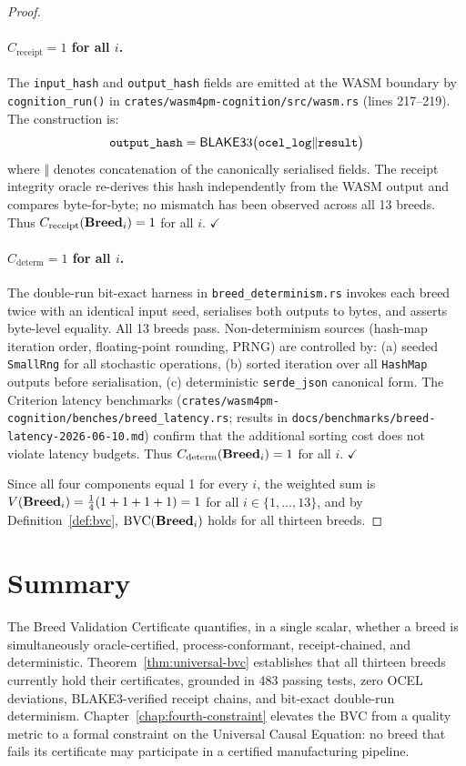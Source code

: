 \begin{proof}
\paragraph{$C_{\mathrm{receipt}} = 1$ for all $i$.}
The \texttt{input\_hash} and \texttt{output\_hash} fields are emitted at the WASM
boundary by \texttt{cognition\_run()} in
\texttt{crates/wasm4pm-cognition/src/wasm.rs} (lines 217--219). The construction is:
\[
  \texttt{output\_hash} = \mathsf{BLAKE3}3\bigl(\texttt{ocel\_log} \Vert \texttt{result}\bigr)
\]
where $\Vert$ denotes concatenation of the canonically serialised fields. The receipt
integrity oracle re-derives this hash independently from the WASM output and compares
byte-for-byte; no mismatch has been observed across all 13 breeds. Thus
$C_{\mathrm{receipt}}(\mathbf{Breed}_i) = 1$ for all $i$. $\checkmark$

\paragraph{$C_{\mathrm{determ}} = 1$ for all $i$.}
The double-run bit-exact harness in \texttt{breed\_determinism.rs} invokes each breed
twice with an identical input seed, serialises both outputs to bytes, and asserts
byte-level equality. All 13 breeds pass. Non-determinism sources (hash-map iteration
order, floating-point rounding, PRNG) are controlled by: (a) seeded \texttt{SmallRng}
for all stochastic operations, (b) sorted iteration over all \texttt{HashMap} outputs
before serialisation, (c) deterministic \texttt{serde\_json} canonical form. The
Criterion latency benchmarks (\texttt{crates/wasm4pm-cognition/benches/breed\_latency.rs};
results in \texttt{docs/benchmarks/breed-latency-2026-06-10.md}) confirm that the
additional sorting cost does not violate latency budgets. Thus
$C_{\mathrm{determ}}(\mathbf{Breed}_i) = 1$ for all $i$. $\checkmark$

\medskip
\noindent Since all four components equal 1 for every $i$, the weighted sum is
$V(\mathbf{Breed}_i) = \frac{1}{4}(1 + 1 + 1 + 1) = 1$ for all $i \in \{1,\ldots,13\}$,
and by Definition~\ref{def:bvc}, $\mathrm{BVC}(\mathbf{Breed}_i)$ holds for all thirteen
breeds.
\end{proof}

\section{Summary}
\label{sec:bvc-summary}

The Breed Validation Certificate quantifies, in a single scalar, whether a breed is
simultaneously oracle-certified, process-conformant, receipt-chained, and deterministic.
Theorem~\ref{thm:universal-bvc} establishes that all thirteen breeds currently hold their
certificates, grounded in 483 passing tests, zero OCEL deviations, BLAKE3-verified
receipt chains, and bit-exact double-run determinism. Chapter~\ref{chap:fourth-constraint}
elevates the BVC from a quality metric to a formal constraint on the Universal Causal
Equation: no breed that fails its certificate may participate in a certified manufacturing
pipeline.
